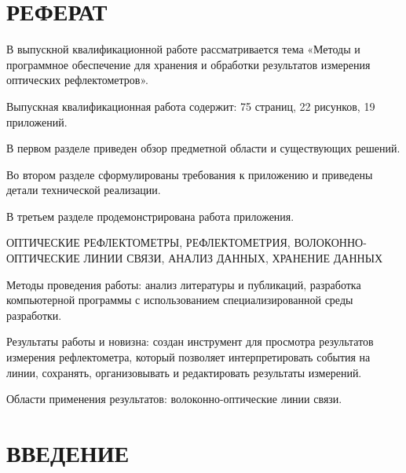 \documentclass[a4paper]{article}
\begin{document}


\section*{РЕФЕРАТ}
\thispagestyle{empty}

В выпускной квалификационной работе рассматривается тема «Методы и программное обеспечение для хранения и обработки результатов измерения оптических рефлектометров».

Выпускная квалификационная работа содержит: 75 страниц, 22 рисунков, 19 приложений.

В первом разделе приведен обзор предметной области и существующих решений.

Во втором разделе сформулированы требования к приложению и приведены детали технической реализации.

В третьем разделе продемонстрирована работа приложения.

ОПТИЧЕСКИЕ РЕФЛЕКТОМЕТРЫ, РЕФЛЕКТОМЕТРИЯ, ВОЛОКОННО-ОПТИЧЕСКИЕ ЛИНИИ СВЯЗИ, АНАЛИЗ ДАННЫХ, ХРАНЕНИЕ ДАННЫХ

Методы проведения работы: анализ литературы и публикаций, разработка компьютерной программы с использованием специализированной среды разработки.

Результаты работы и новизна: создан инструмент для просмотра результатов измерения рефлектометра, который позволяет интерпретировать события на линии, сохранять, организовывать и редактировать результаты измерений.

Области применения результатов: волоконно-оптические линии связи.

\newpage
\renewcommand{\contentsname}{СОДЕРЖАНИЕ}
\tableofcontents
{}

\newpage
\thispagestyle{empty}
\printnoidxglossary[
  title={ПЕРЕЧЕНЬ СОКРАЩЕНИЙ И ОБОЗНАЧЕНИЙ},
  type=\acronymtype
]

\newpage
\thispagestyle{empty}
\printnoidxglossary[
  title={СПИСОК ТЕРМИНОВ}
]

\newpage
\setcounter{page}{12}
\section*{ВВЕДЕНИЕ}

\end{document}
